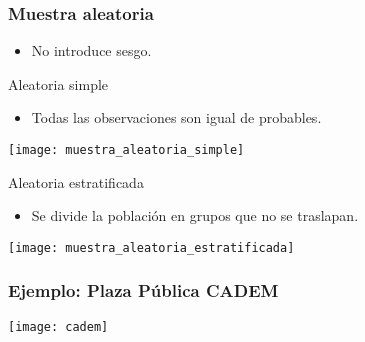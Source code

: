 \documentclass[table]{beamer}
\begin{document}
\begin{frame}
    \frametitle{Muestra aleatoria}
    \begin{block}{}
        \begin{itemize}
            \item No introduce sesgo.
        \end{itemize}
    \end{block}
    \begin{block}{Aleatoria simple}
        \begin{itemize}
            \item Todas las observaciones son igual de probables.
        \end{itemize}
        \begin{center}
            \texttt{[image: muestra\_aleatoria\_simple]}
        \end{center}
    \end{block}
    \begin{block}{Aleatoria estratificada}
        \begin{itemize}
            \item Se divide la población en grupos que no se traslapan.
        \end{itemize}
        \begin{center}
            \texttt{[image: muestra\_aleatoria\_estratificada]}
        \end{center}
    \end{block}
\end{frame}

\begin{frame}
    \frametitle{Ejemplo: Plaza Pública CADEM}
    \begin{center}
        \texttt{[image: cadem]}
    \end{center}
\end{frame}
\end{document}
